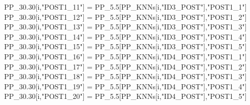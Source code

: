 \documentclass[12pt,twoside]{reedthesis}
\newenvironment{Shaded}{\begin{snugshade}}{\end{snugshade}}
\newcommand{\FloatTok}[1]{\textcolor[rgb]{0.00,0.00,0.81}{#1}}
\newcommand{\NormalTok}[1]{#1}
\newcommand{\StringTok}[1]{\textcolor[rgb]{0.31,0.60,0.02}{#1}}
\begin{document}
\begin{Shaded}
\begin{Highlighting}[]
{\NormalTok{  PP_}\FloatTok{30.30}\NormalTok{[i,}\StringTok{"POST1_11"}\NormalTok{] =}\StringTok{ }\NormalTok{PP_}\FloatTok{5.5}\NormalTok{[PP_KNNs[i,}\StringTok{"ID3_POST"}\NormalTok{],}\StringTok{"POST1_1"}\NormalTok{]}
\NormalTok{  PP_}\FloatTok{30.30}\NormalTok{[i,}\StringTok{"POST1_12"}\NormalTok{] =}\StringTok{ }\NormalTok{PP_}\FloatTok{5.5}\NormalTok{[PP_KNNs[i,}\StringTok{"ID3_POST"}\NormalTok{],}\StringTok{"POST1_2"}\NormalTok{]}
\NormalTok{  PP_}\FloatTok{30.30}\NormalTok{[i,}\StringTok{"POST1_13"}\NormalTok{] =}\StringTok{ }\NormalTok{PP_}\FloatTok{5.5}\NormalTok{[PP_KNNs[i,}\StringTok{"ID3_POST"}\NormalTok{],}\StringTok{"POST1_3"}\NormalTok{]}
\NormalTok{  PP_}\FloatTok{30.30}\NormalTok{[i,}\StringTok{"POST1_14"}\NormalTok{] =}\StringTok{ }\NormalTok{PP_}\FloatTok{5.5}\NormalTok{[PP_KNNs[i,}\StringTok{"ID3_POST"}\NormalTok{],}\StringTok{"POST1_4"}\NormalTok{]}
\NormalTok{  PP_}\FloatTok{30.30}\NormalTok{[i,}\StringTok{"POST1_15"}\NormalTok{] =}\StringTok{ }\NormalTok{PP_}\FloatTok{5.5}\NormalTok{[PP_KNNs[i,}\StringTok{"ID3_POST"}\NormalTok{],}\StringTok{"POST1_5"}\NormalTok{]}
\NormalTok{  PP_}\FloatTok{30.30}\NormalTok{[i,}\StringTok{"POST1_16"}\NormalTok{] =}\StringTok{ }\NormalTok{PP_}\FloatTok{5.5}\NormalTok{[PP_KNNs[i,}\StringTok{"ID4_POST"}\NormalTok{],}\StringTok{"POST1_1"}\NormalTok{]}
\NormalTok{  PP_}\FloatTok{30.30}\NormalTok{[i,}\StringTok{"POST1_17"}\NormalTok{] =}\StringTok{ }\NormalTok{PP_}\FloatTok{5.5}\NormalTok{[PP_KNNs[i,}\StringTok{"ID4_POST"}\NormalTok{],}\StringTok{"POST1_2"}\NormalTok{]}
\NormalTok{  PP_}\FloatTok{30.30}\NormalTok{[i,}\StringTok{"POST1_18"}\NormalTok{] =}\StringTok{ }\NormalTok{PP_}\FloatTok{5.5}\NormalTok{[PP_KNNs[i,}\StringTok{"ID4_POST"}\NormalTok{],}\StringTok{"POST1_3"}\NormalTok{]}
\NormalTok{  PP_}\FloatTok{30.30}\NormalTok{[i,}\StringTok{"POST1_19"}\NormalTok{] =}\StringTok{ }\NormalTok{PP_}\FloatTok{5.5}\NormalTok{[PP_KNNs[i,}\StringTok{"ID4_POST"}\NormalTok{],}\StringTok{"POST1_4"}\NormalTok{]}
\NormalTok{  PP_}\FloatTok{30.30}\NormalTok{[i,}\StringTok{"POST1_20"}\NormalTok{] =}\StringTok{ }\NormalTok{PP_}\FloatTok{5.5}\NormalTok{[PP_KNNs[i,}\StringTok{"ID4_POST"}\NormalTok{],}\StringTok{"POST1_5"}\NormalTok{]}

}
\end{Highlighting}
\end{Shaded}
\end{document}
